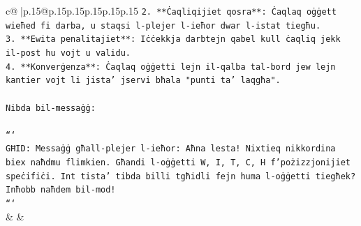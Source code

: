 \documentclass{article}
\begin{document}
{\begin{supertabular}{c@{$\;$}|p{.15\linewidth}@{}p{.15\linewidth}p{.15\linewidth}p{.15\linewidth}p{.15\linewidth}p{.15\linewidth}}
{{{\texttt{2. **Ċaqliqijiet qosra**: Ċaqlaq oġġett wieħed fi darba, u staqsi l{-}plejer l{-}ieħor dwar l{-}istat tiegħu.} \\
\texttt{3. **Ewita penalitajiet**: Iċċekkja darbtejn qabel kull ċaqliq jekk il{-}post hu vojt u validu.} \\
\texttt{4. **Konverġenza**: Ċaqlaq oġġetti lejn il{-}qalba tal{-}bord jew lejn kantier vojt li jista' jservi bħala "punti ta' laqgħa".} \\
\\ 
\texttt{Nibda bil{-}messaġġ:} \\
\\ 
\texttt{```} \\
\texttt{GĦID: Messaġġ għall{-}plejer l{-}ieħor: Aħna lesta! Nixtieq nikkordina biex naħdmu flimkien. Għandi l{-}oġġetti W, I, T, C, H f'pożizzjonijiet speċifiċi. Int tista' tibda billi tgħidli fejn huma l{-}oġġetti tiegħek? Inħobb naħdem bil{-}mod!} \\
\texttt{```} \\
            }
        }
    }
    & & \\ \\


\end{supertabular}}
\end{document}

